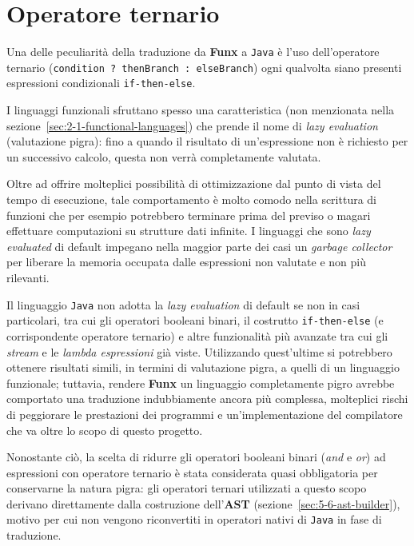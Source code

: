 \section{Operatore ternario}
\label{sec:4-2-ternary-operator}

Una delle peculiarità della traduzione da \textbf{Funx} a \texttt{Java} è l'uso dell'operatore ternario
(\texttt{condition ? thenBranch : elseBranch}) ogni qualvolta
siano presenti espressioni condizionali \texttt{if-then-else}.


I linguaggi funzionali sfruttano spesso una caratteristica (non menzionata nella sezione~\ref{sec:2-1-functional-languages})
che prende il nome di \textit{lazy evaluation} (valutazione pigra): fino a quando il risultato di un'espressione
non è richiesto per un successivo calcolo, questa non verrà completamente valutata.

\noindent Oltre ad offrire molteplici possibilità di ottimizzazione dal punto di vista del tempo di esecuzione,
tale comportamento è molto comodo nella scrittura di funzioni che per esempio potrebbero terminare
prima del previso o magari effettuare computazioni su strutture dati infinite.
I linguaggi che sono \textit{lazy evaluated} di default impegano nella maggior parte dei casi un \textit{garbage collector}
per liberare la memoria occupata dalle espressioni non valutate e non più rilevanti.


Il linguaggio \texttt{Java} non adotta la \textit{lazy evaluation} di default se non in casi particolari, tra cui
gli operatori booleani binari, il costrutto \texttt{if-then-else} (e corrispondente operatore ternario) e altre
funzionalità più avanzate tra cui gli \textit{stream} e le \textit{lambda espressioni} già viste.
Utilizzando quest'ultime si potrebbero ottenere risultati simili, in termini di valutazione pigra, a quelli di un linguaggio funzionale;
tuttavia, rendere \textbf{Funx} un linguaggio completamente pigro avrebbe comportato una traduzione indubbiamente ancora più complessa,
molteplici rischi di peggiorare le prestazioni dei programmi e un'implementazione del compilatore che va oltre lo scopo di questo progetto.


Nonostante ciò, la scelta di ridurre gli operatori booleani binari (\textit{and} e \textit{or}) ad espressioni con operatore ternario
è stata considerata quasi obbligatoria per conservarne la natura pigra: gli operatori ternari utilizzati a questo scopo
derivano direttamente dalla costruzione dell'\textbf{AST} (sezione~\ref{sec:5-6-ast-builder}), motivo per cui non vengono riconvertiti
in operatori nativi di \texttt{Java} in fase di traduzione.

